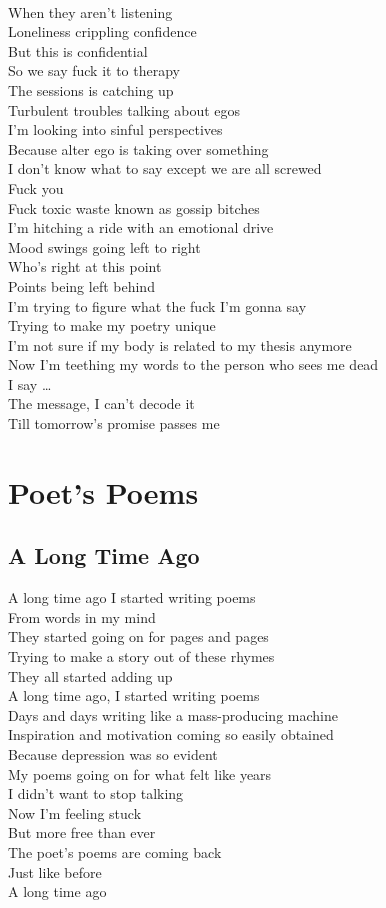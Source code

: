 \documentclass[12pt, b5paper, oneside]{book}
\begin{document}
\\When they aren't listening
\\Loneliness crippling confidence
\\But this is confidential
\\So we say fuck it to therapy
\\The sessions is catching up
\\Turbulent troubles talking about egos
\\I'm looking into sinful perspectives
\\Because alter ego is taking over something
\\I don't know what to say except we are all screwed
\\Fuck you
\\Fuck toxic waste known as gossip bitches
\\I'm hitching a ride with an emotional drive
\\Mood swings going left to right
\\Who's right at this point
\\Points being left behind
\\I'm trying to figure what the fuck I'm gonna say
\\Trying to make my poetry unique
\\I'm not sure if my body is related to my thesis anymore
\\Now I'm teething my words to the person who sees me dead
\\I say \dots 
\\The message, I can't decode it
\\Till tomorrow's promise passes me 
\newpage
\chapter{Poet's Poems}
\section{A Long Time Ago}
A long time ago I started writing poems
\\From words in my mind
\\They started going on for pages and pages
\\Trying to make a story out of these rhymes
\\They all started adding up
\\A long time ago, I started writing poems
\\Days and days writing like a mass-producing machine
\\Inspiration and motivation coming so easily obtained
\\Because depression was so evident
\\My poems going on for what felt like years
\\I didn't want to stop talking
\\Now I'm feeling stuck
\\But more free than ever
\\The poet's poems are coming back
\\Just like before 
\\A long time ago
\newpage
\end{document}
